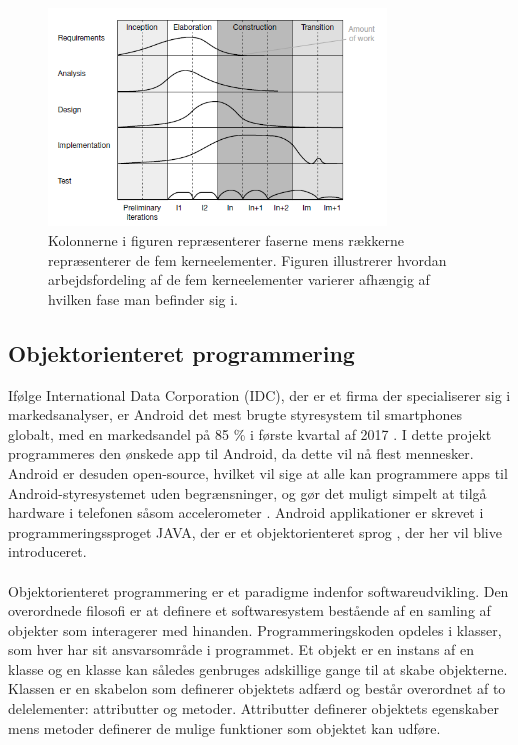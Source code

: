 \begin{figure}[H]
\centering
  \includegraphics[width=0.8\textwidth]{Billeder/UP.png}
   \caption{Kolonnerne i figuren repræsenterer faserne mens rækkerne repræsenterer de fem kerneelementer. Figuren illustrerer hvordan arbejdsfordeling af de fem kerneelementer varierer afhængig af hvilken fase man befinder sig i. \cite{Arlow2002}} 
   \label{fig:UP}
\end{figure}

\subsection{Objektorienteret programmering}
Ifølge International Data Corporation (IDC), der er et firma der specialiserer sig i markedsanalyser, er Android det mest brugte styresystem til smartphones globalt, med en markedsandel på 85 \% i første kvartal af 2017 \citep{AndroidMarketShare}. I dette projekt programmeres den ønskede app til Android, da dette vil nå flest mennesker. Android er desuden open-source, hvilket vil sige at alle kan programmere apps til Android-styresystemet uden begrænsninger, og gør det muligt simpelt at tilgå hardware i telefonen såsom accelerometer \citep{Meier2010}. Android applikationer er skrevet i programmeringssproget JAVA, der er et objektorienteret sprog \citep{Meier2010}, der her vil blive introduceret.\\
\\
Objektorienteret programmering er et paradigme indenfor softwareudvikling. Den overordnede filosofi er at definere et softwaresystem bestående af en samling af objekter som interagerer med hinanden. Programmeringskoden opdeles i klasser, som hver har sit ansvarsområde i programmet. Et objekt er en instans af en klasse og en klasse kan således genbruges adskillige gange til at skabe objekterne. Klassen er en skabelon som definerer objektets adfærd og består overordnet af to delelementer: attributter og metoder. Attributter definerer objektets egenskaber mens metoder definerer de mulige funktioner som objektet kan udføre. \citep{Dathan}

